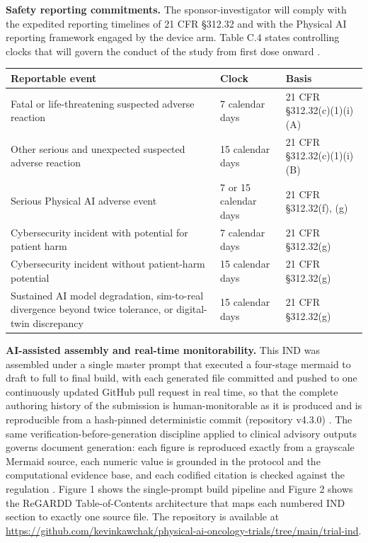 \noindent\textbf{Safety reporting commitments.} The sponsor-investigator will comply with the expedited reporting timelines of 21 CFR \S 312.32 and with the Physical AI reporting framework engaged by the device arm. Table C.4 states controlling clocks that will govern the conduct of the study from first dose onward \cite{cfr312paiuni}.

\noindent\begin{tabularx}{\textwidth}{L{7cm} L{3.6cm} Y}
\toprule
\textbf{Reportable event} & \textbf{Clock} & \textbf{Basis} \\
\midrule
Fatal or life-threatening suspected adverse reaction & 7 calendar days & 21 CFR \S 312.32(c)(1)(i)(A) \\
Other serious and unexpected suspected adverse reaction & 15 calendar days & 21 CFR \S 312.32(c)(1)(i)(B) \\
Serious Physical AI adverse event & 7 or 15 calendar days & 21 CFR \S 312.32(f), (g) \\
Cybersecurity incident with potential for patient harm & 7 calendar days & 21 CFR \S 312.32(g) \\
Cybersecurity incident without patient-harm potential & 15 calendar days & 21 CFR \S 312.32(g) \\
Sustained AI model degradation, sim-to-real divergence beyond twice tolerance, or digital-twin discrepancy & 15 calendar days & 21 CFR \S 312.32(g) \\
\bottomrule
\end{tabularx}
\vspace{-0.35cm}

\noindent\textbf{AI-assisted assembly and real-time monitorability.} This IND was assembled under a single master prompt that executed a four-stage mermaid to draft to full to final build, with each generated file committed and pushed to one continuously updated GitHub pull request in real time, so that the complete authoring history of the submission is human-monitorable as it is produced and is reproducible from a hash-pinned deterministic commit (repository v4.3.0) \cite{oncotrialllm,natlpaiplatf}. The same verification-before-generation discipline applied to clinical advisory outputs governs document generation: each figure is reproduced exactly from a grayscale Mermaid source, each numeric value is grounded in the protocol and the computational evidence base, and each codified citation is checked against the regulation \cite{clintrustpai,llmcomp16fda}. Figure 1 shows the single-prompt build pipeline and Figure 2 shows the ReGARDD Table-of-Contents architecture that maps each numbered IND section to exactly one source file. The repository is available at \url{https://github.com/kevinkawchak/physical-ai-oncology-trials/tree/main/trial-ind}.

